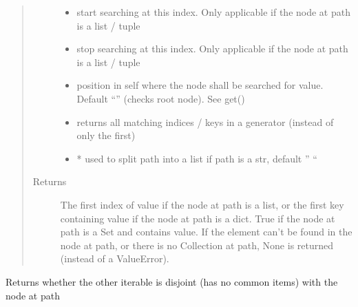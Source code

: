 \documentclass[a4paper,10pt,english]{sphinxmanual}
\begin{document}
\begin{fulllineitems}
\begin{fulllineitems}
\begin{quote}
\begin{description}
\begin{itemize}
\item {}
\sphinxAtStartPar
{} \textendash{} start searching at this index. Only applicable if the node at path is a list / tuple

\item {}
\sphinxAtStartPar
{} \textendash{} stop searching at this index. Only applicable if the node at path is a list / tuple

\item {}
\sphinxAtStartPar
{} \textendash{} position in self where the node shall be searched for value. Default “” (checks root node). See get()

\item {}
\sphinxAtStartPar
{} \textendash{} returns all matching indices / keys in a generator (instead of only the first)

\item {}
\sphinxAtStartPar
{} \textendash{} * used to split path into a list if path is a str, default ” “

\end{itemize}

\item[{Returns}] \leavevmode
\sphinxAtStartPar
The first index of value if the node at path is a list, or the first key containing value if the node at
path is a dict. True if the node at path is a Set and contains value. If the element can’t be found in the
node at path, or there is no Collection at path, None is returned (instead of a ValueError).

\end{description}\end{quote}

\end{fulllineitems}


\begin{fulllineitems}
\label{\detokenize{fagus.fagus:fagus.fagus.Fagus.isdisjoint}}
\pysigstartsignatures
{}
\pysigstopsignatures
\sphinxAtStartPar
Returns whether the other iterable is disjoint (has no common items) with the node at path


\end{fulllineitems}
\end{fulllineitems}
\end{document}
